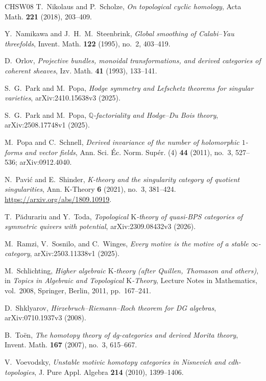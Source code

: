 \documentclass{amsart}
\theoremstyle{plain}
\theoremstyle{definition}
\newcommand{\K}{\mathrm{K}}
\begin{document}
\begin{thebibliography}{CHSW08}
T.~Nikolaus and P.~Scholze,
\emph{On topological cyclic homology}, Acta Math. \textbf{221} (2018), 203--409.

Y.~Namikawa and J.~H.~M.~Steenbrink,
\emph{Global smoothing of Calabi--Yau threefolds}, Invent. Math. \textbf{122} (1995), no.~2, 403--419.

D.~Orlov, \emph{Projective bundles, monoidal transformations, and derived categories of coherent sheaves}, Izv. Math. \textbf{41} (1993), 133--141.

S.~G.~Park and M.~Popa,
\emph{Hodge symmetry and Lefschetz theorems for singular varieties}, arXiv:2410.15638v3 (2025).

S.~G.~Park and M.~Popa,
\emph{$\mathbb Q$-factoriality and Hodge--Du Bois theory}, arXiv:2508.17748v1 (2025).

M.~Popa and C.~Schnell,
\emph{Derived invariance of the number of holomorphic $1$-forms and vector fields}, Ann. Sci. \'Ec. Norm. Sup\'er. (4) \textbf{44} (2011), no.~3, 527--536;
arXiv:0912.4040.

N.~Pavi\'c and E.~Shinder,
\emph{K-theory and the singularity category of quotient singularities}, Ann. K-Theory \textbf{6} (2021), no.~3, 381--424.
\url{https://arxiv.org/abs/1809.10919}.

T.~P\u{a}durariu and Y.~Toda, \emph{Topological $\K$-theory of quasi-BPS categories of symmetric quivers with potential}, arXiv:2309.08432v3 (2026).



M.~Ramzi, V.~Sosnilo, and C.~Winges,
\emph{Every motive is the motive of a stable $\infty$-category}, arXiv:2503.11338v1 (2025).

M.~Schlichting,
\emph{Higher algebraic $\K$-theory
(after Quillen, Thomason and others)}, in \emph{Topics in Algebraic and Topological $\K$-Theory}, Lecture Notes in Mathematics, vol.~2008, Springer, Berlin, 2011, pp.~167--241.

D.~Shklyarov,
\emph{Hirzebruch--Riemann--Roch theorem for DG algebras}, arXiv:0710.1937v3 (2008).

B.~To\"en,
\emph{The homotopy theory of dg-categories and derived Morita theory}, Invent. Math. \textbf{167} (2007), no.~3, 615--667.

V.~Voevodsky,
\emph{Unstable motivic homotopy categories in Nisnevich and cdh-topologies}, J. Pure Appl. Algebra \textbf{214} (2010), 1399--1406.


\end{thebibliography}
\end{document}
